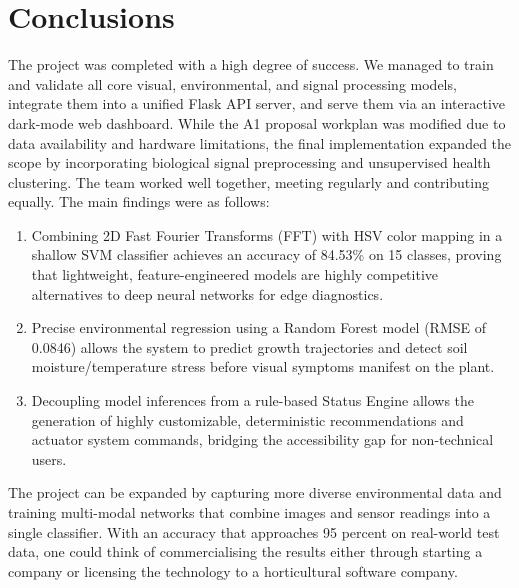 \documentclass[11pt,a4paper]{article}
\begin{document}
\section{Conclusions}
The project was completed with a high degree of success. We managed to train and validate all core visual, environmental, and signal processing models, integrate them into a unified Flask API server, and serve them via an interactive dark-mode web dashboard. While the A1 proposal workplan was modified due to data availability and hardware limitations, the final implementation expanded the scope by incorporating biological signal preprocessing and unsupervised health clustering. The team worked well together, meeting regularly and contributing equally. The main findings were as follows:
\begin{enumerate}
    \item Combining 2D Fast Fourier Transforms (FFT) with HSV color mapping in a shallow SVM classifier achieves an accuracy of 84.53\% on 15 classes, proving that lightweight, feature-engineered models are highly competitive alternatives to deep neural networks for edge diagnostics.
    \item Precise environmental regression using a Random Forest model (RMSE of 0.0846) allows the system to predict growth trajectories and detect soil moisture/temperature stress before visual symptoms manifest on the plant.
    \item Decoupling model inferences from a rule-based Status Engine allows the generation of highly customizable, deterministic recommendations and actuator system commands, bridging the accessibility gap for non-technical users.
\end{enumerate}

The project can be expanded by capturing more diverse environmental data and training multi-modal networks that combine images and sensor readings into a single classifier. With an accuracy that approaches 95 percent on real-world test data, one could think of commercialising the results either through starting a company or licensing the technology to a horticultural software company.

\newpage
\appendix
\end{document}
